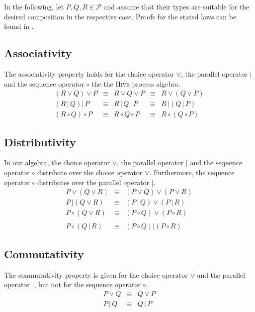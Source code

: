 In the following, let $P, Q, R \in \mathcal{P}$ and assume that their types are suitable for the desired composition in the respective case. Proofs for the stated laws can be found in .

\subsection{Associativity}
The associativity property holds for the choice operator $\vee$, the parallel operator $|$ and the sequence operator $\circ$ the the \textsc{Hive} process algebra.
\begin{equation*}
\begin{array}{rcccl}
  \left( R \vee Q \right) \vee P & \equiv & R \vee Q \vee P & \equiv & R \vee \left( Q \vee P \right) \\
  \left( R \,|\, Q \right) |\, P & \equiv & R \,|\, Q \,|\, P & \equiv & R \,| \left( Q \,|\, P \right) \\
  \left( R \circ Q \right) \circ P & \equiv & R \circ Q \circ P & \equiv & R \circ \left( Q \circ P \right)
\end{array}
\end{equation*}

\subsection{Distributivity}
In our algebra, the choice operator $\vee$, the parallel operator $|$ and the sequence operator $\circ$ distribute over the choice operator $\vee$. Furthermore, the sequence operator $\circ$ distributes over the parallel operator $|$.
\begin{eqnarray*}
  P \vee \left( Q \vee R \right) & \equiv & \left( P \vee Q \right) \vee \left( P \vee R \right) \\
  P \,| \left( Q \vee R \right) & \equiv & \left( P \,|\, Q \right) \vee \left( P \,|\, R \right) \\
  P \circ \left( Q \vee R \right) & \equiv & \left( P \circ Q \right) \vee \left( P \circ R \right) \\
  & & \\
  P \circ \left( Q \,|\, R \right) & \equiv & \left( P \circ Q \right) | \left( P \circ R \right)
\end{eqnarray*}

\subsection{Commutativity}
The commutativity property is given for the choice operator $\vee$ and the parallel operator $|$, but not for the sequence operator $\circ$.
\begin{eqnarray*}
  P \vee Q & \equiv & Q \vee P \\
  P \,|\, Q & \equiv & Q \,|\, P
\end{eqnarray*}


